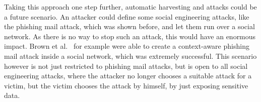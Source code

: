Taking this approach one step further, automatic harvesting and attacks could
be a future scenario. An attacker could define some social engineering attacks,
like the phishing mail attack, which was shown before, and let them run over a
social network. As there is no way to stop such an attack, this would have an
enormous impact. Brown et al.~\cite{brown2008} for example were able to create
a context-aware phishing mail attack inside a social network, which was
extremely successful. This scenario however is not just restricted to phishing
mail attacks, but is open to all social engineering attacks, where the attacker
no longer chooses a suitable attack for a victim, but the victim chooses the
attack by himself, by just exposing sensitive data.
